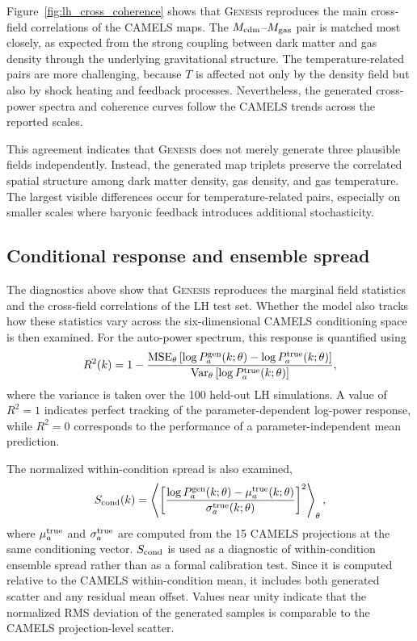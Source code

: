 \documentclass[usenatbib]{mnras}
\newcommand{\Mcdm}{M_{\rm cdm}}
\newcommand{\Mgas}{M_{\rm gas}}
\newcommand{\Tgas}{T}
\begin{document}
Figure~\ref{fig:lh_cross_coherence} shows that \textsc{Genesis}
reproduces the main cross-field correlations of the CAMELS maps. The
$\Mcdm$--$\Mgas$ pair is matched most closely, as expected from the
strong coupling between dark matter and gas density through the
underlying gravitational structure. The temperature-related pairs are
more challenging, because $\Tgas$ is affected not only by the density
field but also by shock heating and feedback processes. Nevertheless,
the generated cross-power spectra and coherence curves follow the
CAMELS trends across the reported scales.

This agreement indicates that \textsc{Genesis} does not merely
generate three plausible fields independently. Instead, the generated
map triplets preserve the correlated spatial structure among dark
matter density, gas density, and gas temperature. The largest visible
differences occur for temperature-related pairs, especially on smaller
scales where baryonic feedback introduces additional stochasticity.

\subsection{Conditional response and ensemble spread}
\label{sec:eval_response}

The diagnostics above show that \textsc{Genesis} reproduces the
marginal field statistics and the cross-field correlations of the LH
test set. Whether the model also tracks how these statistics vary
across the six-dimensional CAMELS conditioning space is then examined.
For the auto-power spectrum, this response is quantified using
\begin{equation}
  R^2(k)
  =
  1 -
  \frac{
    {\rm MSE}_{\theta}
    \left[
      \log P_a^{\rm gen}(k;\theta)
      -
      \log P_a^{\rm true}(k;\theta)
    \right]
  }{
    {\rm Var}_{\theta}
    \left[
      \log P_a^{\rm true}(k;\theta)
    \right]
  },
  \label{eq:lh_r2}
\end{equation}
where the variance is taken over the 100 held-out LH simulations.
A value of $R^2=1$ indicates perfect tracking of the
parameter-dependent log-power response, while $R^2=0$ corresponds to
the performance of a parameter-independent mean prediction.

The normalized within-condition spread is also examined,
\begin{equation}
  S_{\rm cond}(k)
  =
  \left\langle
  \left[
  \frac{
    \log P_a^{\rm gen}(k;\theta)
    -
    \mu_a^{\rm true}(k;\theta)
  }{
    \sigma_a^{\rm true}(k;\theta)
  }
  \right]^2
  \right\rangle_{\theta},
  \label{eq:scond}
\end{equation}
where $\mu_a^{\rm true}$ and $\sigma_a^{\rm true}$ are computed from
the 15 CAMELS projections at the same conditioning vector. $S_{\rm cond}$
is used as a diagnostic of within-condition ensemble spread
rather than as a formal calibration test. Since it is computed relative
to the CAMELS within-condition mean, it includes both generated
scatter and any residual mean offset. Values near unity indicate that
the normalized RMS deviation of the generated samples is comparable
to the CAMELS projection-level scatter.
\end{document}
